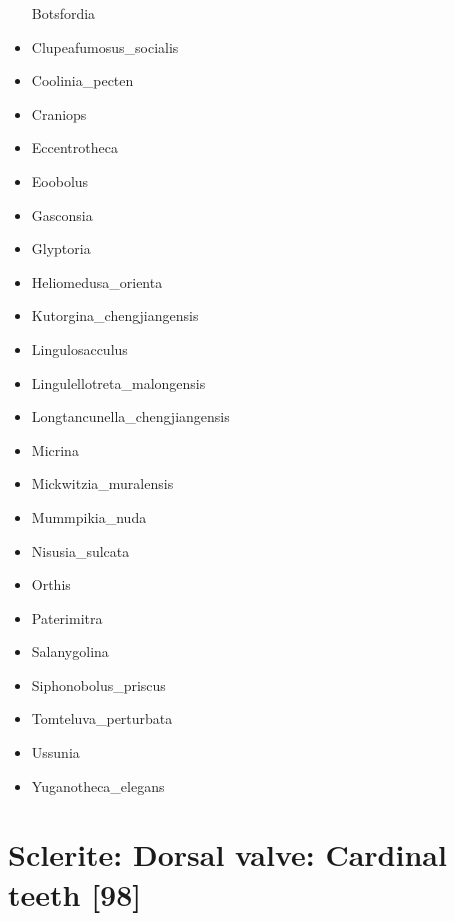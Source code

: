 \documentclass[openany]{book}
\theoremstyle{definition}
\theoremstyle{definition}
\theoremstyle{definition}
\theoremstyle{remark}
\begin{document}
\begin{itemize}
  Botsfordia\\
\item
  Clupeafumosus\_socialis\\
\item
  Coolinia\_pecten\\
\item
  Craniops\\
\item
  Eccentrotheca\\
\item
  Eoobolus\\
\item
  Gasconsia\\
\item
  Glyptoria\\
\item
  Heliomedusa\_orienta\\
\item
  Kutorgina\_chengjiangensis\\
\item
  Lingulosacculus\\
\item
  Lingulellotreta\_malongensis\\
\item
  Longtancunella\_chengjiangensis\\
\item
  Micrina\\
\item
  Mickwitzia\_muralensis\\
\item
  Mummpikia\_nuda\\
\item
  Nisusia\_sulcata\\
\item
  Orthis\\
\item
  Paterimitra\\
\item
  Salanygolina\\
\item
  Siphonobolus\_priscus\\
\item
  Tomteluva\_perturbata\\
\item
  Ussunia\\
\item
  Yuganotheca\_elegans
\end{itemize}

\section{Sclerite: Dorsal valve: Cardinal teeth
{[}98{]}}\label{sclerite-dorsal-valve-cardinal-teeth-98}
\end{document}
